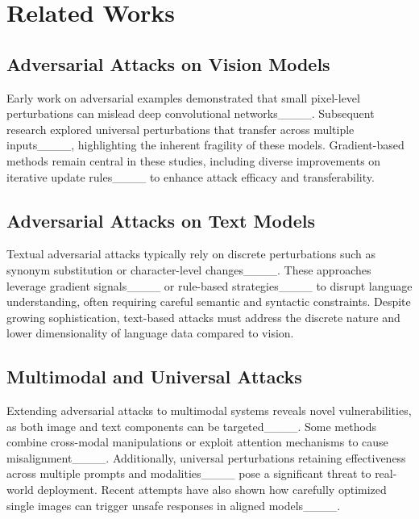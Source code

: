 \section{Related Works}

\subsection{Adversarial Attacks on Vision Models}
Early work on adversarial examples demonstrated that small pixel-level perturbations can mislead deep convolutional networks____. Subsequent research explored universal perturbations that transfer across multiple inputs____, highlighting the inherent fragility of these models. Gradient-based methods remain central in these studies, including diverse improvements on iterative update rules____ to enhance attack efficacy and transferability.

\subsection{Adversarial Attacks on Text Models}
Textual adversarial attacks typically rely on discrete perturbations such as synonym substitution or character-level changes____. These approaches leverage gradient signals____ or rule-based strategies____ to disrupt language understanding, often requiring careful semantic and syntactic constraints. Despite growing sophistication, text-based attacks must address the discrete nature and lower dimensionality of language data compared to vision.

\subsection{Multimodal and Universal Attacks}
Extending adversarial attacks to multimodal systems reveals novel vulnerabilities, as both image and text components can be targeted____. Some methods combine cross-modal manipulations or exploit attention mechanisms to cause misalignment____. Additionally, universal perturbations retaining effectiveness across multiple prompts and modalities____ pose a significant threat to real-world deployment. Recent attempts have also shown how carefully optimized single images can trigger unsafe responses in aligned models____.


